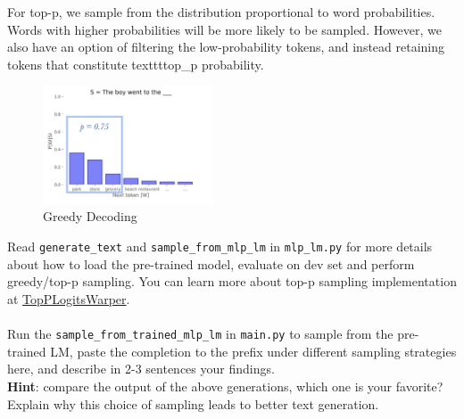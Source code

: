 For top-p, we sample from the distribution proportional to word probabilities. Words with higher probabilities will be more likely to be sampled.
However, we also have an option of filtering the low-probability tokens, and instead retaining tokens that constitute texttt{top\_p} probability.
\begin{figure}[h]
    \centering
    \includegraphics[width=0.45\textwidth]{figures/p_sampling.jpeg}
    \caption{Greedy Decoding}
\end{figure}

\noindent Read \texttt{generate\_text} and \texttt{sample\_from\_mlp\_lm} in \texttt{mlp\_lm.py} for more details about how to load the pre-trained model, evaluate on dev set and perform greedy/top-p sampling. You can learn more about top-p sampling implementation at \href{https://huggingface.co/docs/transformers/v4.37.2/en/internal/generation_utils#transformers.TopPLogitsWarper}{TopPLogitsWarper}.\\\\
\noindent \todo{} Run the \texttt{sample\_from\_trained\_mlp\_lm} in \texttt{main.py} to sample from the pre-trained LM, paste the completion to the prefix under different sampling strategies here, and describe in 2-3 sentences your findings.\\
\noindent \textbf{Hint}: compare the output of the above generations, which one is your favorite? Explain why this choice of sampling leads to better text generation.

